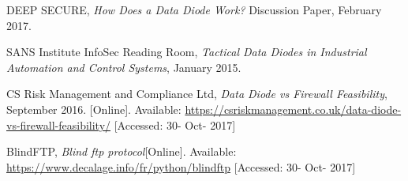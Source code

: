 \documentclass[a4paper,10pt]{article}
\begin{document}
\clearpage
\begin{thebibliography}{9}
DEEP SECURE,
\textit{How	Does a Data Diode Work?}
Discussion Paper, February 2017.

SANS Institute InfoSec Reading Room,
\textit{Tactical Data Diodes in Industrial Automation and Control Systems}, January 2015.

CS Risk Management and Compliance Ltd,
\textit{Data Diode vs Firewall Feasibility}, September 2016. [Online]. Available: \url{https://csriskmanagement.co.uk/data-diode-vs-firewall-feasibility/} [Accessed: 30- Oct- 2017]

BlindFTP,
\textit{Blind ftp protocol}[Online]. Available: \url{https://www.decalage.info/fr/python/blindftp} [Accessed: 30- Oct- 2017]

\end{thebibliography}
\end{document}
